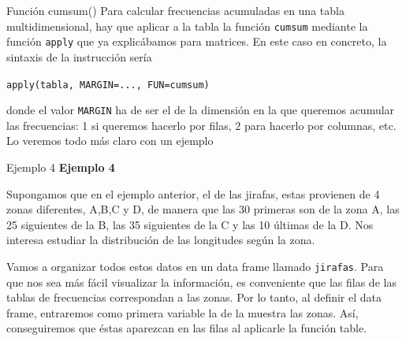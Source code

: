 \documentclass[
  ignorenonframetext,
  aspectratio=169]{beamer}
\begin{document}
\begin{frame}[fragile]{Función cumsum()}
\protect\hypertarget{funciuxf3n-cumsum-5}{}
Para calcular frecuencias acumuladas en una tabla multidimensional, hay
que aplicar a la tabla la función \texttt{cumsum} mediante la función
\texttt{apply} que ya explicábamos para matrices. En este caso en
concreto, la sintaxis de la instrucción sería

\texttt{apply(tabla,\ MARGIN=...,\ FUN=cumsum)}

donde el valor \texttt{MARGIN} ha de ser el de la dimensión en la que
queremos acumular las frecuencias: 1 si queremos hacerlo por filas, 2
para hacerlo por columnas, etc. Lo veremos todo más claro con un ejemplo
\end{frame}

\begin{frame}[fragile]{Ejemplo 4}
\protect\hypertarget{ejemplo-4}{}
\textbf{Ejemplo 4}

Supongamos que en el ejemplo anterior, el de las jirafas, estas
provienen de 4 zonas diferentes, A,B,C y D, de manera que las 30
primeras son de la zona A, las 25 siguientes de la B, las 35 siguientes
de la C y las 10 últimas de la D. Nos interesa estudiar la distribución
de las longitudes según la zona.

Vamos a organizar todos estos datos en un data frame llamado
\texttt{jirafas}. Para que nos sea más fácil visualizar la información,
es conveniente que las filas de las tablas de frecuencias correspondan a
las zonas. Por lo tanto, al definir el data frame, entraremos como
primera variable la de la muestra las zonas. Así, conseguiremos que
éstas aparezcan en las filas al aplicarle la función table.
\end{frame}
\end{document}
